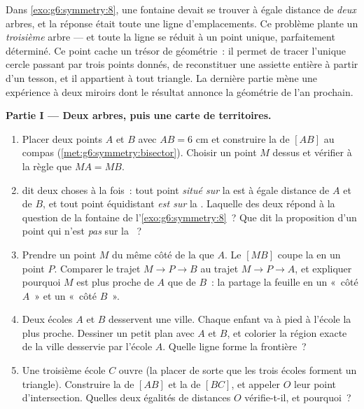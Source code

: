 \begin{problem}
\label{pb:g6:symmetry:1}
Dans \cref{exo:g6:symmetry:8}, une fontaine devait se trouver à égale
distance de \emph{deux} arbres, et la réponse était toute une ligne
d'emplacements. Ce problème plante un \emph{troisième} arbre --- et
toute la ligne se réduit à un point unique, parfaitement déterminé.
Ce point cache un trésor de géométrie~: il permet de tracer l'unique
cercle passant par trois points donnés, de reconstituer une assiette
entière à partir d'un tesson, et il appartient à tout triangle. La
dernière partie mène une expérience à deux miroirs dont le résultat
annonce la géométrie de l'an prochain.

\medskip
\noindent\textbf{Partie I --- Deux arbres, puis une carte de
territoires.}
\begin{enumerate}
  \item Placer deux points $A$ et $B$ avec $AB = 6$ cm et construire
        la  de $[AB]$ au compas
        (\cref{met:g6:symmetry:bisector}). Choisir un point $M$
        dessus et vérifier à la règle que $MA = MB$.
  \item {} dit deux choses à la
        fois~: tout point \emph{situé sur} la  est à égale
        distance de $A$ et de $B$, et tout point équidistant
        \emph{est sur} la . Laquelle des deux répond à la
        question de la fontaine de l'\cref{exo:g6:symmetry:8}~? Que
        dit la proposition d'un point qui n'est \emph{pas} sur la
        ~?
  \item Prendre un point $M$ du même côté de la  que $A$.
        Le  $[MB]$ coupe la  en un point $P$.
        Comparer le trajet $M \to P \to B$ au trajet
        $M \to P \to A$, et expliquer pourquoi $M$ est plus proche
        de $A$ que de $B$~: la  partage la feuille en un
        «~côté $A$~» et un «~côté $B$~».
  \item Deux écoles $A$ et $B$ desservent une ville. Chaque enfant
        va à pied à l'école la plus proche. Dessiner un petit plan
        avec $A$ et $B$, et colorier la région exacte de la ville
        desservie par l'école $A$. Quelle ligne forme la frontière~?
  \item Une troisième école $C$ ouvre (la placer de sorte que les
        trois écoles forment un triangle). Construire la 
        de $[AB]$ et la  de $[BC]$, et appeler $O$ leur
        point d'intersection. Quelles deux égalités de distances $O$
        vérifie-t-il, et pourquoi~?
\end{enumerate}


\end{problem}
